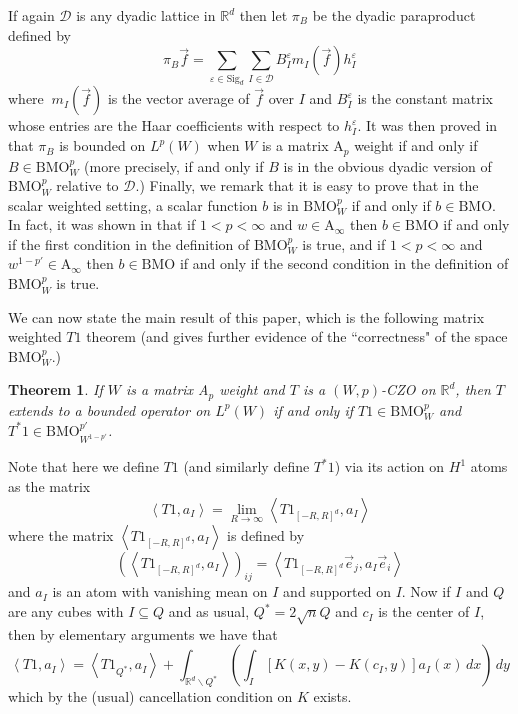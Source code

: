 \documentclass[12pt,reqno ]{amsart}
\numberwithin{equation}{section}
\newtheorem{theorem}{Theorem}[section]
\theoremstyle{definition}
\newcommand{\Rd}{\ensuremath{\mathbb{R}^d}}
\newcommand{\D}{\ensuremath{\mathscr{D}}}
\newcommand{\BMOW}{\ensuremath{{\text{BMO}}_W ^p}}
\newcommand{\BMOWq}{\ensuremath{{\text{BMO}}_{W^{1 - p'}}^{p'} }}
\newcommand{\V}[1]{\ensuremath{\vec{#1}}}
\newcommand{\ip}[2]{\ensuremath{\left\langle#1,#2\right\rangle}}
\renewcommand{\S}{\ensuremath{\text{Sig}_d}}
\begin{document}
  If again $\D$ is any dyadic lattice in $\Rd$ then let $\pi_B$ be the dyadic paraproduct defined by \begin{equation} \label{ParaprodDef} \pi_B \vec{f} = \sum_{\varepsilon \in \S} \sum_{I \in \D} B_I ^\varepsilon m_I (\vec{f}) h_I ^\varepsilon   \end{equation} where $\ m_I (\vec{f})$ is the vector average of $\vec{f}$ over $I$ and $B_I ^\varepsilon$ is the constant matrix whose entries are the Haar coefficients with respect to $h_I ^\varepsilon$.
 It was then proved in \cite{IKP} that $\pi_B$ is bounded on $L^p(W)$ when $W$ is a matrix A${}_p$ weight if and only if $B \in \BMOW$ (more precisely, if and only if $B$ is in the obvious dyadic version of $\BMOW$ relative to $\D$.)  Finally, we remark that it is easy to prove that in the scalar weighted setting, a scalar function $b$ is in $\BMOW$ if and only if $b \in \text{BMO}$.  In fact, it was shown in \cite{MW} that if $1 < p < \infty$ and $w \in \text{A}_\infty$ then $b \in \text{BMO}$ if and only if the first condition in the definition of $\BMOW$ is true, and if $1 < p < \infty$ and $w^{1 - p'}  \in \text{A}_\infty$ then $b \in \text{BMO}$ if and only if the second condition in the definition of $\BMOW$ is true.

 We can now state the main result of this paper, which is the following matrix weighted $T1$ theorem (and gives further evidence of the ``correctness" of the space $\BMOW$.)    \begin{theorem}\label{T1Thm}   \noindent If $W$ is a matrix A${}_p$ weight and $T$ is a $(W, p)$-CZO on $\Rd$, then $T$ extends to a bounded operator on $L^p(W)$  if and only if $T1 \in \BMOW$ and $T^* 1 \in \BMOWq$. \end{theorem} \noindent Note that here we define $T1$ (and similarly define $T^* 1$) via its action on $H^1$ atoms as the matrix \begin{equation*} \ip{T1}{a_I} = \lim_{R \rightarrow \infty}  \ip{T 1_{[-R, R]^d}}{a_I}   \end{equation*} where the matrix $\ip{T 1_{[-R, R]^d}}{a_I}$ is defined by  \begin{equation*} \left(\ip{T 1_{[-R, R]^d}}{a_I}\right)_{ij} = \ip{T 1_{[-R, R]^d} \V{e}_j}{a_I \V{e}_i}  \end{equation*}  and $a_I$ is an atom with vanishing mean on $I$ and supported on $I$.    Now if $I$ and $Q$ are any cubes with $I \subseteq Q$ and as usual,  $Q^* = 2\sqrt{n} Q$ and $c_I$ is the center of $I$, then by elementary arguments we have that \begin{equation} \ip{T1}{a_I} = \ip{T 1_{Q^*}}{a_I} + \int_{\Rd \backslash Q^*} \left(\int_I [K(x, y) - K(c_I, y)] a_I(x) \, dx \right)\, dy  \label{T1IntDef} \end{equation} which by the (usual) cancellation condition on $K$ exists.
\end{document}
